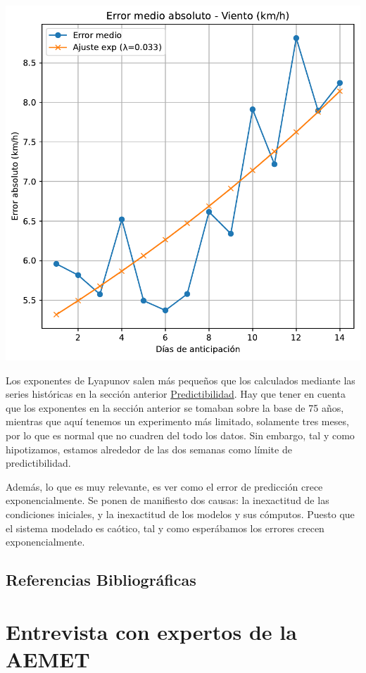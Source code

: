 \documentclass[
  10pt,
  a4paper,
  DIV=11,
  numbers=noendperiod,
  open=any]{scrreprt}
\makeatletter
\newcommand*\pandocbounded[1]{%
  \sbox\pandoc@box{#1}%
  \Gscale@div\@tempa{\textheight}{\dimexpr\ht\pandoc@box+\dp\pandoc@box\relax}%
  \Gscale@div\@tempb{\linewidth}{\wd\pandoc@box}%
  \ifdim\@tempb\p@<\@tempa\p@\let\@tempa\@tempb\fi%
  \ifdim\@tempa\p@<\p@\scalebox{\@tempa}{\usebox\pandoc@box}%
  \else\usebox{\pandoc@box}%
  \fi%
}
\numberwithin{equation}{chapter}
\numberwithin{equation}{section}
\renewcommand{\[}{\begin{equation}}
\renewcommand{\]}{\end{equation}}
\providecommand{\pandocbounded}[1]{#1}%
\renewcommand{\pandocbounded}[1]{\begingroup\centering #1\par\endgroup}
\makeatother
\begin{document}
\pandocbounded{\includegraphics[keepaspectratio]{03-meteorologia/predicciones_files/figure-pdf/cell-4-output-4.pdf}}

Los exponentes de Lyapunov salen más pequeños que los calculados
mediante las series históricas en la sección anterior
\hyperref[sec-lyapunov]{Predictibilidad}. Hay que tener en cuenta que
los exponentes en la sección anterior se tomaban sobre la base de 75
años, mientras que aquí tenemos un experimento más limitado, solamente
tres meses, por lo que es normal que no cuadren del todo los datos. Sin
embargo, tal y como hipotizamos, estamos alrededor de las dos semanas
como límite de predictibilidad.

Además, lo que es muy relevante, es ver como el error de predicción
crece exponencialmente. Se ponen de manifiesto dos causas: la
inexactitud de las condiciones iniciales, y la inexactitud de los
modelos y sus cómputos. Puesto que el sistema modelado es caótico, tal y
como esperábamos los errores crecen exponencialmente.

\section{Referencias
Bibliográficas}\label{referencias-bibliogruxe1ficas}

\chapter{Entrevista con expertos de la
AEMET}\label{entrevista-con-expertos-de-la-aemet}
\end{document}
